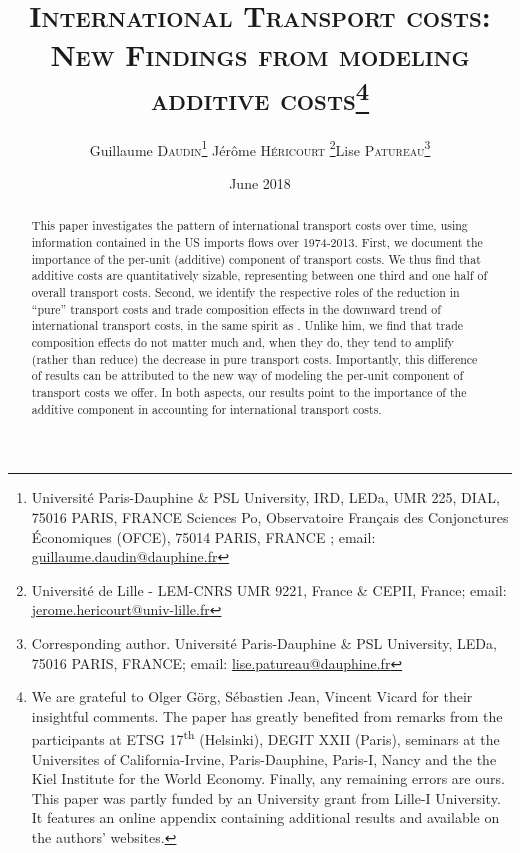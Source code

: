 \documentclass[a4paper,11pt]{article}
\begin{document}
\title{\textsc{International Transport costs:\\New Findings from modeling additive costs}\thanks{We are grateful to Olger Görg, S\'{e}bastien Jean, Vincent Vicard for their insightful comments. The paper has greatly benefited from remarks from the participants at ETSG 17\textsuperscript{th} (Helsinki), DEGIT XXII (Paris), seminars at the Universites of California-Irvine, Paris-Dauphine, Paris-I, Nancy and the the Kiel Institute for the World Economy.
Finally, any remaining errors are ours.
This paper was partly funded by an University grant from Lille-I University.
It features an online appendix containing additional results and available on the authors' websites.}}

\author{Guillaume \textsc{Daudin}\thanks{%
Universit\'{e} Paris-Dauphine \& PSL University, IRD, LEDa, UMR 225, DIAL, 75016 PARIS, FRANCE \newline
Sciences Po, Observatoire Fran\c{c}ais des Conjonctures \'{E}conomiques (OFCE), 75014 PARIS, FRANCE \newline
; email: \url{guillaume.daudin@dauphine.fr}}  \qquad J\'{e}r\^{o}me \textsc{H\'{e}ricourt} \thanks{Universit\'{e} de Lille - LEM-CNRS UMR 9221, France \& CEPII, France; email: \url{jerome.hericourt@univ-lille.fr}}\qquad Lise \textsc{Patureau}\thanks{Corresponding author.
Universit\'{e} Paris-Dauphine \& PSL University, LEDa, 75016 PARIS, FRANCE;  email: \url{lise.patureau@dauphine.fr} } }


\date{June 2018}
 \maketitle
\bigskip

\begin{abstract}
This paper investigates the pattern of international transport costs over time, using information contained in the US imports flows over 1974-2013. First, we document the importance of the per-unit (additive) component of transport costs. We thus find that additive costs are quantitatively sizable, representing between one third and one half of overall transport costs. Second, we identify the respective roles of the reduction in ``pure'' transport costs and trade composition effects in the downward trend of international transport costs, in the same spirit as \cite{hummels2007}. Unlike him, we find that trade composition effects do not matter much and, when they do, they tend to amplify (rather than reduce) the decrease in pure transport costs. Importantly, this difference of results can be attributed to the new way of modeling the per-unit component of transport costs we offer. In both aspects, our results point to the importance of the additive component in accounting for international transport costs.
\end{abstract}
\end{document}
